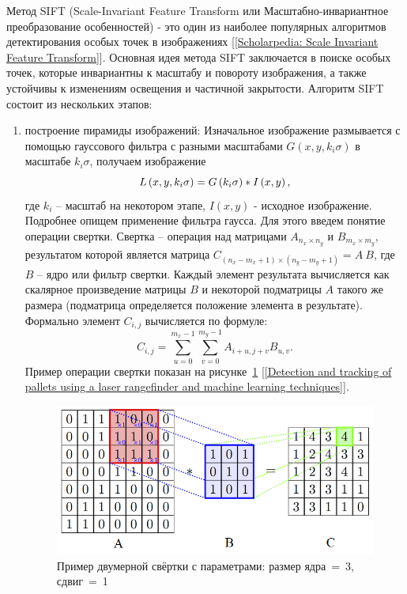 \documentclass[14pt, a4paper]{extreport}
\begin{document}
	Метод SIFT (Scale-Invariant Feature Transform или Масштабно-\linebreak инвариантное преобразование особенностей) - это один из наиболее популярных алгоритмов детектирования особых точек в изображениях [\ref{Scholarpedia: Scale Invariant Feature Transform}]. Основная идея метода SIFT заключается в поиске особых точек, которые инвариантны к масштабу и повороту изображения, а также устойчивы к изменениям освещения и частичной закрытости. Алгоритм SIFT состоит из нескольких этапов:
	\begin{enumerate}[label={\arabic*)}]
	\item построение пирамиды изображений: Изначальное изображение размывается с помощью гауссового фильтра с разными масштабами $G\left(x,y,k_i\sigma \right)$ в масштабе $k_i\sigma$, получаем изображение 
	\vspace*{-0.2cm}
	\begin{equation*}
		L\left(x,y,k_i\sigma \right)=G\left(k_i\sigma \right)*I\left(x,y\right), 
		\label{L(x,y,sigma)}
		\vspace*{-0.4cm}
	\end{equation*}
	где $k_i$ -- масштаб на некотором этапе, $I\left(x,y\right)$ - исходное изображение. 
	Подробнее опищем применение фильтра гаусса. Для этого введем понятие операции свертки. Свертка -- операция над матрицами $A_{n_x \times n_y}$ и $B_{m_x \times m_y}$, результатом которой является матрица $C_{(n_x - m_x + 1)\times(n_y - m_y + 1)}=A~B$, где $B$ -- ядро или фильтр свертки. Каждый элемент результата вычисляется как скалярное произведение матрицы $B$ и некоторой подматрицы $A$ такого же размера (подматрица определяется положение элемента в результате). Формально элемент $C_{i,j}$ вычисляется по формуле: 
	\begin{equation*}
		C_{i, j} = \sum_{u=0}^{m_x - 1} \sum_{v = 0}^{m_y - 1} A_{i+u, j+v}B_{u, v}. 
		\label{eq:Cij1}
	\end{equation*}
	Пример операции свертки показан на рисунке~\ref{fig:conv} [\ref{Detection and tracking of pallets using a laser rangefinder and machine learning techniques}].
	\begin{figure}[ht!]
		\centering
		\includegraphics[width=\textwidth]{image/chapter_2/conv-example.png}
		\caption{Пример двумерной свёртки с параметрами: размер ядра~=~3, сдвиг~=~1}
		\label{fig:conv}
	\end{figure}


\end{enumerate}
\end{document}
